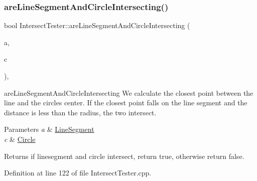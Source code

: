\subsubsection{\texorpdfstring{are\+Line\+Segment\+And\+Circle\+Intersecting()}{areLineSegmentAndCircleIntersecting()}}
{\footnotesize\ttfamily bool Intersect\+Tester\+::are\+Line\+Segment\+And\+Circle\+Intersecting (\begin{DoxyParamCaption}\item[{\hyperlink{class_line_segment}{Line\+Segment}}]{a,  }\item[{\hyperlink{class_circle}{Circle}}]{c }\end{DoxyParamCaption})\hspace{0.3cm}{\ttfamily [static]}, {\ttfamily [private]}}



are\+Line\+Segment\+And\+Circle\+Intersecting We calculate the closest point between the line and the circle\textquotesingle{}s center. If the closest point falls on the line segment and the distance is less than the radius, the two intersect. 


\begin{DoxyParams}{Parameters}
{\em a} & \hyperlink{class_line_segment}{Line\+Segment} \\
\hline
{\em c} & \hyperlink{class_circle}{Circle} \\
\hline
\end{DoxyParams}
\begin{DoxyReturn}{Returns}
if linesegment and circle intersect, return true, otherwise return false. 
\end{DoxyReturn}


Definition at line 122 of file Intersect\+Tester.\+cpp.


